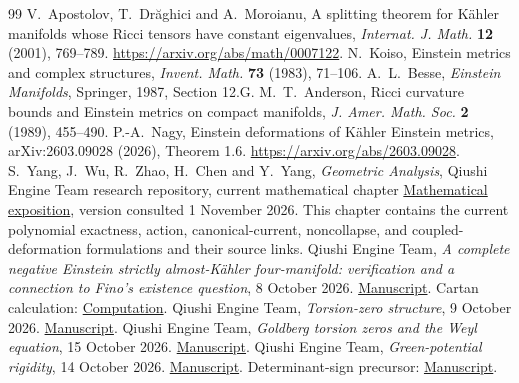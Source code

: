 \documentclass[11pt,a4paper]{article}
\theoremstyle{definition}
\theoremstyle{remark}
\begin{document}
\begin{thebibliography}{99}
 V.~Apostolov, T.~Dr\u aghici and A.~Moroianu, A splitting theorem for K\"ahler manifolds whose Ricci tensors have constant eigenvalues, \emph{Internat. J. Math.} \textbf{12} (2001), 769--789. \url{https://arxiv.org/abs/math/0007122}.
 N.~Koiso, Einstein metrics and complex structures, \emph{Invent. Math.} \textbf{73} (1983), 71--106.
 A.~L.~Besse, \emph{Einstein Manifolds}, Springer, 1987, Section 12.G.
 M.~T.~Anderson, Ricci curvature bounds and Einstein metrics on compact manifolds, \emph{J. Amer. Math. Soc.} \textbf{2} (1989), 455--490.
 P.-A.~Nagy, Einstein deformations of K\"ahler Einstein metrics, arXiv:2603.09028 (2026), Theorem 1.6. \url{https://arxiv.org/abs/2603.09028}.
 S.~Yang, J.~Wu, R.~Zhao, H.~Chen and Y.~Yang, \emph{Geometric Analysis}, Qiushi Engine Team research repository, current mathematical chapter \href{https://github.com/Cherish0925/Geometric-Analysis/blob/main/docs/GOLDBERG.md}{Mathematical exposition}, version consulted 1 November 2026. This chapter contains the current polynomial exactness, action, canonical-current, noncollapse, and coupled-deformation formulations and their source links.
 Qiushi Engine Team, \emph{A complete negative Einstein strictly almost-K\"ahler four-manifold: verification and a connection to Fino's existence question}, 8 October 2026. \href{https://github.com/Cherish0925/Geometric-Analysis/blob/main/archive/originals/2026-10-08/Q4_Complete_Example_and_Fino_Question.tex}{Manuscript}. Cartan calculation: \href{https://github.com/Cherish0925/Geometric-Analysis/blob/main/archive/originals/2026-10-08/Q4_independent_cartan.py}{Computation}.
 Qiushi Engine Team, \emph{Torsion-zero structure}, 9 October 2026. \href{https://github.com/Cherish0925/Geometric-Analysis/blob/main/archive/originals/2026-10-09/Q4_Torsion_Zero_Structure.tex}{Manuscript}.
 Qiushi Engine Team, \emph{Goldberg torsion zeros and the Weyl equation}, 15 October 2026. \href{https://github.com/Cherish0925/Geometric-Analysis/blob/main/archive/originals/2026-10-15/Goldberg_Torsion_Zeros_and_Weyl_Equation_20261015.tex}{Manuscript}.
 Qiushi Engine Team, \emph{Green-potential rigidity}, 14 October 2026. \href{https://github.com/Cherish0925/Geometric-Analysis/blob/main/archive/originals/2026-10-14/Q4_Green_Potential_Rigidity.tex}{Manuscript}. Determinant-sign precursor: \href{https://github.com/Cherish0925/Geometric-Analysis/blob/main/archive/originals/2026-10-13/Q4_Determinant_Sign_Rigidity.tex}{Manuscript}.

\end{thebibliography}
\end{document}
